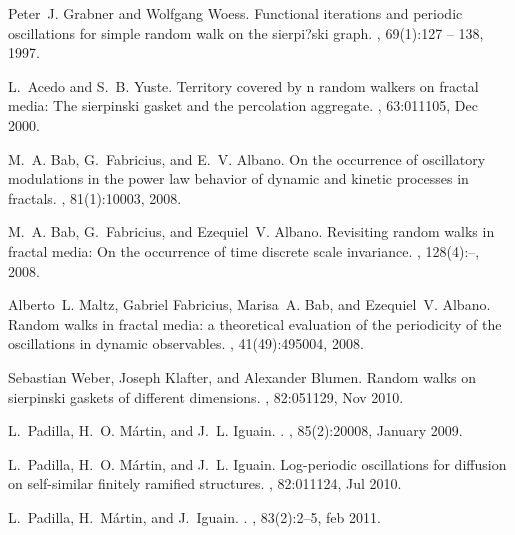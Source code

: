 \documentclass[12pt]{iopart}
\begin{document}
\begin{thebibliography}{10}

Peter~J. Grabner and Wolfgang Woess.
\newblock Functional iterations and periodic oscillations for simple random
  walk on the sierpi?ski graph.
, 69(1):127 -- 138,
  1997.

L.~Acedo and S.~B. Yuste.
\newblock Territory covered by n random walkers on fractal media: The
  sierpinski gasket and the percolation aggregate.
, 63:011105, Dec 2000.

M.~A. Bab, G.~Fabricius, and E.~V. Albano.
\newblock On the occurrence of oscillatory modulations in the power law
  behavior of dynamic and kinetic processes in fractals.
, 81(1):10003, 2008.

M.~A. Bab, G.~Fabricius, and Ezequiel~V. Albano.
\newblock Revisiting random walks in fractal media: On the occurrence of time
  discrete scale invariance.
, 128(4):--, 2008.

Alberto~L. Maltz, Gabriel Fabricius, Marisa~A. Bab, and Ezequiel~V. Albano.
\newblock Random walks in fractal media: a theoretical evaluation of the
  periodicity of the oscillations in dynamic observables.
,
  41(49):495004, 2008.

Sebastian Weber, Joseph Klafter, and Alexander Blumen.
\newblock Random walks on sierpinski gaskets of different dimensions.
, 82:051129, Nov 2010.

L.~Padilla, H.~O. M\'{a}rtin, and J.~L. Iguain.
.
, 85(2):20008, January 2009.

L.~Padilla, H.~O. M\'artin, and J.~L. Iguain.
\newblock Log-periodic oscillations for diffusion on self-similar finitely
  ramified structures.
, 82:011124, Jul 2010.

L.~Padilla, H.~M{\'{a}}rtin, and J.~Iguain.
.
, 83(2):2--5, feb 2011.


\end{thebibliography}
\end{document}
